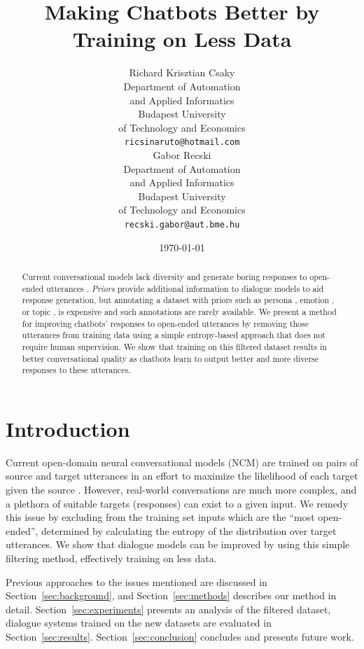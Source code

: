 \documentclass[11pt,a4paper]{article}
\title{Making Chatbots Better by Training on Less Data}
\author{Richard Krisztian Csaky \\
  Department of Automation \\ and Applied Informatics \\
  Budapest University \\ of Technology and Economics \\
  {\tt ricsinaruto@hotmail.com} \\\And
  Gabor Recski \\
  Department of Automation \\ and Applied Informatics \\
  Budapest University \\ of Technology and Economics \\
  {\tt recski.gabor@aut.bme.hu} \\}
\date{\today}
\begin{document}
\maketitle
\begin{abstract}
    Current conversational models lack diversity and generate boring
responses to open-ended utterances \cite{Li:2015c,Wei:2017, Shao:2017b}.
    {\it Priors} provide additional information to dialogue models to
    aid response generation, but annotating a dataset with priors such
as persona \cite{Li:2016a}, emotion
\cite{Zhou:2017}, or topic \cite{Xing:2017}, is expensive and such
annotations are rarely available. We present a method for improving
    chatbots' responses to open-ended utterances by removing those
    utterances from
    training data using a simple entropy-based approach that
    does not require human supervision. We show that training
    on this filtered dataset results in better conversational quality as
    chatbots learn to output better and more diverse responses to these
    utterances.
\end{abstract}

\section{Introduction}
Current open-domain neural conversational models (NCM) are trained on
pairs of source and target utterances in an effort to maximize
the likelihood of each target given the source
\cite{Vinyals:2015d}. However, real-world conversations are much more complex,
and a plethora of suitable targets (responses) can exist to a given input.
We
remedy this issue by excluding from the training set inputs which are 
the ``most open-ended'', determined by calculating the entropy of the
distribution over target utterances.
We show that dialogue models
can be improved by using this simple filtering method, effectively training on
less data.

Previous approaches to the issues mentioned are discussed in
Section~\ref{sec:background}, and Section~\ref{sec:methods} describes our
method in detail.
Section~\ref{sec:experiments} presents an analysis of the filtered
dataset, dialogue systems trained on the new datasets are evaluated in
Section~\ref{sec:results}. Section~\ref{sec:conclusion} concludes and presents
future work.
\end{document}
